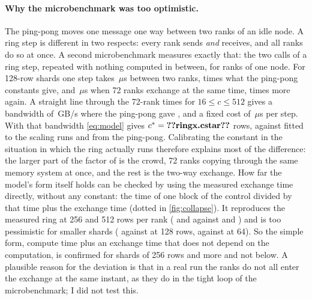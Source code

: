\paragraph{Why the microbenchmark was too optimistic.} The ping-pong moves one
message one way between two ranks of an idle node. A ring step is different in two
respects: every rank sends \emph{and} receives, and all ranks do so at once. A
second microbenchmark measures exactly that: the two  calls of a
ring step, repeated with nothing computed in between, for 
ranks of one node. For 128-row shards one step takes \,$\mu$s
between two ranks,  times what the ping-pong
constants give, and \,$\mu$s when 72 ranks exchange at the same
time,  times more again. A straight line through the 72-rank
times for $16\le c\le512$ gives a bandwidth of \,GB/s where the
ping-pong gave , and a fixed cost of \,$\mu$s per
step. With that bandwidth \cref{eq:model} gives $c^*=\n{ringx.cstar}$ rows, against
 fitted to the scaling runs and  from the
ping-pong. Calibrating the constant in the situation in which the ring actually
runs therefore explains most of the difference: the larger part of the factor of
 is the crowd, 72 ranks copying through the same memory system
at once, and the rest is the two-way exchange. How far the model's form itself
holds can be checked by using the measured exchange time directly, without any
constant: the time of one block of the control divided by that time plus the
exchange time (dotted in \cref{fig:collapse}). It reproduces the measured ring at
256 and 512 rows per rank ( and  against
 and ) and is too pessimistic for smaller
shards ( against  at 128 rows,
 against  at 64). So the simple form,
compute time plus an exchange time that does not depend on the computation, is
confirmed for shards of 256 rows and more and not below. A plausible reason for
the deviation is that in a real run the ranks do not all enter the exchange at the
same instant, as they do in the tight loop of the microbenchmark; I did not test
this.

